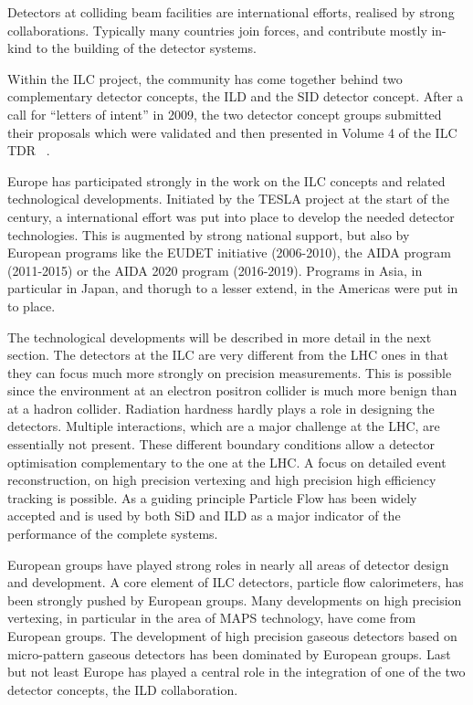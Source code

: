 \documentclass[%
 reprint,
 amsmath,amssymb,
 aps,
]{revtex4-1}
\begin{document}
Detectors at colliding beam facilities are international efforts, realised by strong collaborations. Typically many countries join forces, and contribute mostly in-kind to the building of the detector systems. 

Within the ILC project, the community has come together behind two complementary detector concepts, the ILD and the SID detector concept. After a call for ``letters of intent'' in 2009, the two detector concept groups submitted their proposals which were validated and then presented in Volume 4 of the ILC TDR ~\cite{ILC-TDR}.

Europe has participated strongly in the work on the ILC concepts and related technological developments. Initiated by the TESLA project at the start of the century, a international effort was put into place to develop the needed detector technologies. This is augmented by strong national support, but also by European programs like the EUDET initiative (2006-2010), the AIDA program (2011-2015) or the AIDA 2020 program (2016-2019). Programs in Asia, in particular in Japan, and thorugh to a lesser extend, in the Americas were put in to place. 

The technological developments will be described in more detail in the next section. The detectors at the ILC are very different from the LHC ones in that they can focus much more strongly on precision measurements. This is possible since the environment at an electron positron collider is much more benign than at a hadron collider. Radiation hardness hardly plays a role in designing the detectors. Multiple interactions, which are a major challenge at the LHC, are essentially not present. These different boundary conditions allow a detector optimisation complementary to the one at the LHC. A focus on detailed event reconstruction, on high precision vertexing and high precision high efficiency tracking is possible. As a guiding principle Particle Flow has been widely accepted and is used by both SiD and ILD as a major indicator of the performance of the complete systems. 

European groups have played strong roles in nearly all areas of detector design and development. A core element of ILC detectors, particle flow calorimeters, has been strongly pushed by European groups. Many developments on high precision vertexing, in particular in the area of MAPS technology, have come from European groups. The development of high precision gaseous detectors based on micro-pattern gaseous detectors has been dominated by European groups. Last but not least Europe has played a central role in the integration of one of the two detector concepts, the ILD collaboration.  
\end{document}

